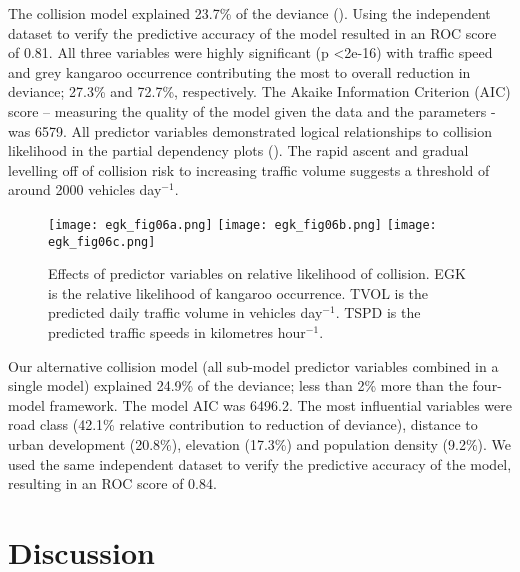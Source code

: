 The collision model explained 23.7\% of the deviance (). Using the independent dataset to verify the predictive accuracy of the model resulted in an ROC score of 0.81.  All three variables were highly significant (p \textless 2e-16) with traffic speed and grey kangaroo occurrence contributing the most to overall reduction in deviance; 27.3\% and 72.7\%, respectively.  The Akaike Information Criterion (AIC) score – measuring the quality of the model given the data and the parameters - was 6579.  All predictor variables demonstrated logical relationships to collision likelihood in the partial dependency plots (). The rapid ascent and gradual levelling off of collision risk to increasing traffic volume suggests a threshold of around 2000 vehicles day$^{-1}$.

\begin{figure*}[htp]
  \centering
  \texttt{[image: egk\_fig06a.png]}
  \texttt{[image: egk\_fig06b.png]}
  \texttt{[image: egk\_fig06c.png]}
  \caption[Effects of predictor variables on relative likelihood of collision]{Effects of predictor variables on relative likelihood of collision. EGK is the relative likelihood of kangaroo occurrence. TVOL is the predicted daily traffic volume in vehicles day$^{-1}$. TSPD is the predicted traffic speeds in kilometres hour$^{-1}$.}
  \label{egk_effects}
\end{figure*}

Our alternative collision model (all sub-model predictor variables combined in a single model) explained 24.9\% of the deviance; less than 2\% more than the four-model framework.  The model AIC was 6496.2. The most influential variables were road class (42.1\% relative contribution to reduction of deviance), distance to urban development (20.8\%), elevation (17.3\%) and population density (9.2\%). We used the same independent dataset to verify the predictive accuracy of the model, resulting in an ROC score of 0.84.

\section{Discussion}

